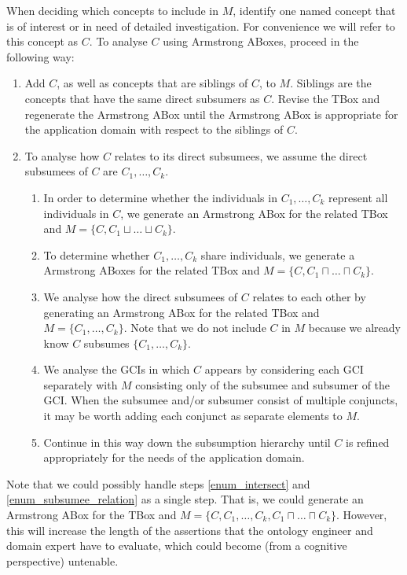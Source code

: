 \documentclass{amsart}
\begin{document}
  When deciding which concepts to include in $M$, identify one named concept that is of interest or in need of detailed investigation. For convenience we will refer to this concept as $C$. To analyse $C$ using Armstrong ABoxes, proceed in the following way:
    \begin{enumerate}
    \item Add $C$, as well as concepts that are siblings of $C$, to $M$. Siblings are the concepts that have the same direct subsumers as $C$. Revise the TBox and regenerate the Armstrong ABox until the Armstrong ABox is appropriate for the application domain with respect to the siblings of $C$.
    \item To analyse how $C$ relates to its direct subsumees,  we assume the direct subsumees of $C$ are $C_1, \ldots, C_k$.
    \begin{enumerate}
     \item \label{enum_cover} In order to determine whether the individuals in $C_1, \ldots, C_k$ represent all individuals in $C$, we generate an Armstrong ABox for the related TBox and $M = \{C, C_1 \sqcup \ldots \sqcup C_k\}$. 
     \item \label{enum_intersect} To determine whether $C_1, \ldots, C_k$ share individuals, we generate a Armstrong ABoxes for the related TBox and $M = \{C, C_1 \sqcap \ldots \sqcap C_k\}$.
     \item \label{enum_subsumee_relation}We analyse how the direct subsumees of $C$ relates to each other by generating an Armstrong ABox for the related TBox and $M = \{C_1, \ldots, C_k\}$. Note that we do not include $C$ in $M$ because we already know $C$ subsumes $\{C_1, \ldots, C_k\}$. 
     \item We analyse the GCIs in which $C$ appears by considering each GCI separately with $M$ consisting only of the subsumee and subsumer of the GCI. 
     When the subsumee and/or subsumer consist of multiple conjuncts, it may be worth  adding each conjunct as separate elements to $M$.
     \item Continue in this way down the subsumption hierarchy until $C$ is refined appropriately for the needs of the application domain.
    \end{enumerate}    
    \end{enumerate}
    
    Note that we could possibly handle steps \ref{enum_intersect} and \ref{enum_subsumee_relation} as a single step. That is, we could generate an Armstrong ABox for the TBox and $M = \{C,  C_1, \ldots, C_k, C_1 \sqcap \ldots \sqcap C_k\}$. However, this will increase the length of the assertions that the ontology engineer and domain expert have to evaluate, which could become (from a cognitive perspective) untenable.
  
\end{document}
